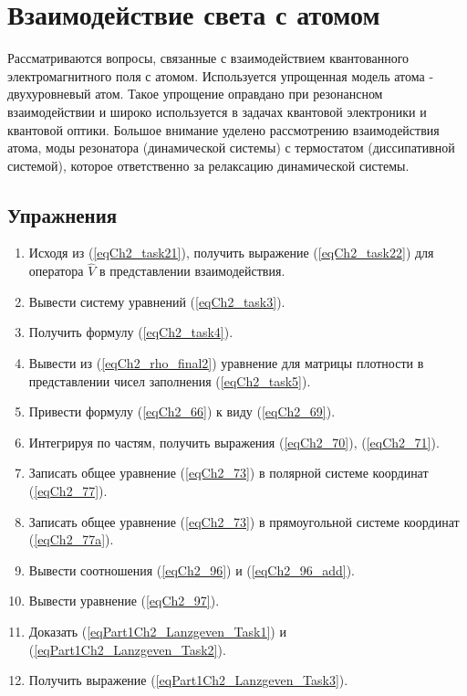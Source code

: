 \chapter{Взаимодействие света с атомом}
\label{chInteraction}

Рассматриваются вопросы, связанные с взаимодействием квантованного
электромагнитного поля с атомом. Используется упрощенная модель атома -
двухуровневый атом. Такое упрощение оправдано при резонансном
взаимодействии и широко используется в задачах квантовой электроники и
квантовой оптики. Большое внимание уделено рассмотрению
взаимодействия атома, моды резонатора (динамической системы) с
термостатом (диссипативной системой), которое ответственно за
релаксацию динамической системы.  














\section{Упражнения}
\begin{enumerate}
\item Исходя из (\ref{eqCh2_task21}), получить выражение
  (\ref{eqCh2_task22}) для оператора $\hat{V}$ в представлении
  взаимодействия. 
\item Вывести систему уравнений (\ref{eqCh2_task3}).
\item Получить формулу (\ref{eqCh2_task4}).
\item Вывести из (\ref{eqCh2_rho_final2}) уравнение для матрицы
  плотности в представлении чисел заполнения (\ref{eqCh2_task5}). 
\item Привести формулу (\ref{eqCh2_66}) к виду (\ref{eqCh2_69}).
\item Интегрируя по частям, получить выражения (\ref{eqCh2_70}),
  (\ref{eqCh2_71}).
\item Записать общее уравнение (\ref{eqCh2_73}) в полярной системе
  координат (\ref{eqCh2_77}). 
\item Записать общее уравнение (\ref{eqCh2_73}) в прямоугольной
  системе координат (\ref{eqCh2_77a}). 
\item Вывести соотношения (\ref{eqCh2_96}) и (\ref{eqCh2_96_add}).
\item Вывести уравнение (\ref{eqCh2_97}).
\item Доказать (\ref{eqPart1Ch2_Lanzgeven_Task1}) и (\ref{eqPart1Ch2_Lanzgeven_Task2}).
\item Получить выражение (\ref{eqPart1Ch2_Lanzgeven_Task3}).
\end{enumerate}

